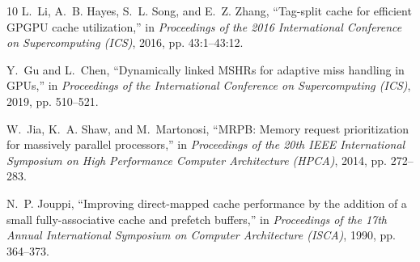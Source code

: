 \documentclass[conference,letterpaper]{IEEEtran}
\begin{document}
\begin{thebibliography}{10}
L.~Li, A.~B. Hayes, S.~L. Song, and E.~Z. Zhang, ``Tag-split cache for
  efficient {GPGPU} cache utilization,'' in \emph{Proceedings of the 2016
  International Conference on Supercomputing (ICS)}, 2016, pp. 43:1--43:12.

Y.~Gu and L.~Chen, ``Dynamically linked {MSHRs} for adaptive miss handling in
  {GPUs},'' in \emph{Proceedings of the International Conference on
  Supercomputing (ICS)}, 2019, pp. 510--521.

W.~Jia, K.~A. Shaw, and M.~Martonosi, ``{MRPB}: Memory request prioritization
  for massively parallel processors,'' in \emph{Proceedings of the 20th IEEE
  International Symposium on High Performance Computer Architecture (HPCA)},
  2014, pp. 272--283.

N.~P. Jouppi, ``Improving direct-mapped cache performance by the addition of a
  small fully-associative cache and prefetch buffers,'' in \emph{Proceedings of
  the 17th Annual International Symposium on Computer Architecture (ISCA)},
  1990, pp. 364--373.

\end{thebibliography}
\end{document}

